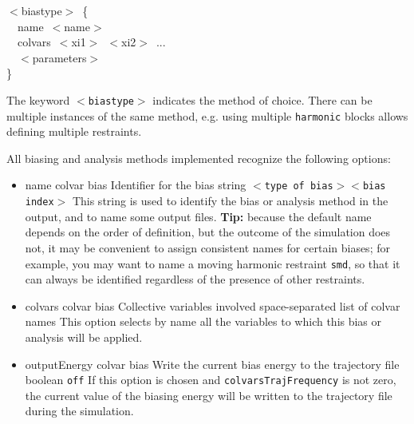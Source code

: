 \begin{cvexampleinput}

\-$<$biastype$>$~\{\\
\-~~name~$<$name$>$ \\
\-~~colvars~$<$xi1$>$~$<$xi2$>$~...\\
\-~~$<$parameters$>$\\
\}
\end{cvexampleinput}

\noindent{}The keyword \texttt{$<$biastype$>$} indicates the method of choice.
There can be multiple instances of the same method, e.g.{} using multiple \texttt{harmonic} blocks allows defining multiple restraints.

All biasing and analysis methods implemented recognize the following options:
\begin{itemize}

\item %
  \keydef
    {name}{%
    colvar bias}{%
    Identifier for the bias}{%
    string}{%
    \texttt{$<$type of bias$><$bias index$>$}}{%
    This string is used to identify the bias or analysis method in the output, and to name some output files.
    \textbf{Tip:} because the default name depends on the order of definition, but the outcome of the simulation does not, it may be convenient to assign consistent names for certain biases; for example, you may want to name a moving harmonic restraint \texttt{smd}, so that it can always be identified regardless of the presence of other restraints.
    }

\item %
  \key
    {colvars}{%
    colvar bias}{%
    Collective variables involved}{%
    space-separated list of colvar names}{%
    This option selects by name all the variables to which this bias or analysis will be applied.}

\item %
  \keydef
    {outputEnergy}{%
    colvar bias}{%
    Write the current bias energy to the trajectory file}{%
    boolean}{%
    \texttt{off}}{%
    If this option is chosen and \texttt{colvarsTrajFrequency} is not zero, the current value of the biasing energy will be written to the trajectory file during the simulation.
}


\end{itemize}
